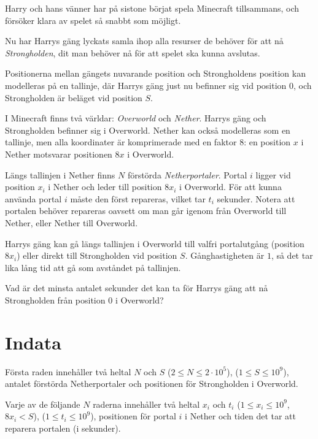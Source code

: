 \noindent


Harry och hans vänner har på sistone börjat spela Minecraft tillsammans, och försöker klara av spelet så snabbt som möjligt.

Nu har Harrys gäng lyckats samla ihop alla resurser de behöver för att nå \textit{Strongholden}, dit man behöver nå för att spelet ska kunna avslutas.

Positionerna mellan gängets nuvarande position och Strongholdens position kan modelleras på en tallinje, 
där Harrys gäng just nu befinner sig vid position $0$, och Strongholden är beläget vid position $S$.

I Minecraft finns två världar: \textit{Overworld} och \textit{Nether}. Harrys gäng och Strongholden befinner sig i Overworld.
Nether kan också modelleras som en tallinje, men alla koordinater är komprimerade med en faktor $8$:
en position $x$ i Nether motsvarar positionen $8x$ i Overworld.

Längs tallinjen i Nether finns $N$ förstörda \textit{Netherportaler}. Portal $i$ ligger vid position $x_i$ i Nether och leder till position $8x_i$ i Overworld.
För att kunna använda portal $i$ måste den först repareras, vilket tar $t_i$ sekunder. 
Notera att portalen behöver repareras oavsett om man går igenom från Overworld till Nether, eller Nether till Overworld.

Harrys gäng kan gå längs tallinjen i Overworld till valfri portalutgång (position $8x_i$) eller direkt till Strongholden vid position $S$.
Gånghastigheten är $1$, så det tar lika lång tid att gå som avståndet på tallinjen.

Vad är det minsta antalet sekunder det kan ta för Harrys gäng att nå Strongholden från position $0$ i Overworld?

\section*{Indata}
Första raden innehåller två heltal $N$ och $S$ ($2 \le N \le 2 \cdot 10^5$), ($1 \le S \le 10^9$), antalet förstörda Netherportaler och positionen för Strongholden i Overworld.

Varje av de följande $N$ raderna innehåller två heltal $x_i$ och $t_i$ ($1 \le x_i \le 10^9$, $8x_i < S$), ($1 \le t_i \le 10^9$), positionen för portal $i$ i Nether och tiden det tar att reparera portalen (i sekunder).

